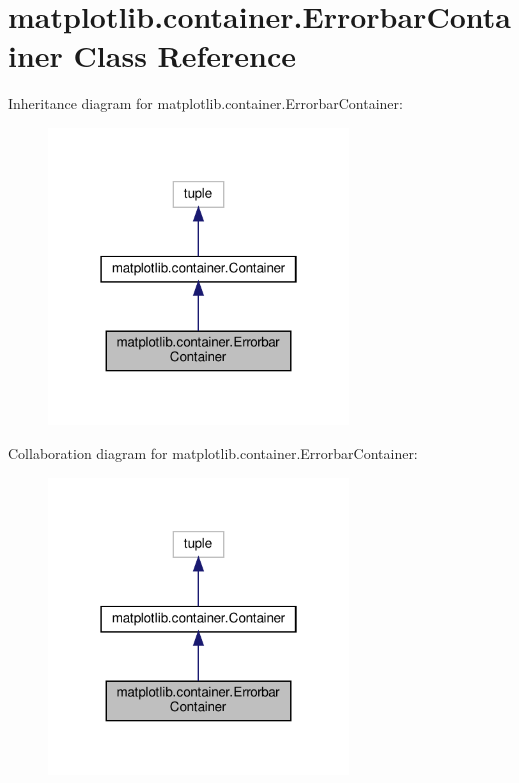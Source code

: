 \hypertarget{classmatplotlib_1_1container_1_1ErrorbarContainer}{}\section{matplotlib.\+container.\+Errorbar\+Container Class Reference}
\label{classmatplotlib_1_1container_1_1ErrorbarContainer}


Inheritance diagram for matplotlib.\+container.\+Errorbar\+Container\+:
\nopagebreak
\begin{figure}[H]
\begin{center}
\leavevmode
\includegraphics[width=226pt]{classmatplotlib_1_1container_1_1ErrorbarContainer__inherit__graph}
\end{center}
\end{figure}


Collaboration diagram for matplotlib.\+container.\+Errorbar\+Container\+:
\nopagebreak
\begin{figure}[H]
\begin{center}
\leavevmode
\includegraphics[width=226pt]{classmatplotlib_1_1container_1_1ErrorbarContainer__coll__graph}
\end{center}
\end{figure}
